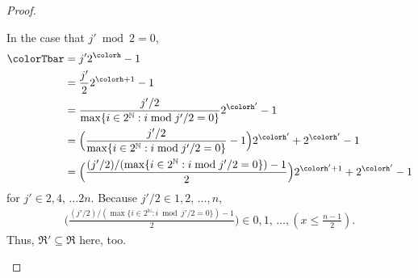 \begin{proof}
\begin{proofpart}
In the case that $j' \bmod 2 = 0$, 
\begin{align*}
\colorTbar
&= j'2^{\colorh} - 1\\
&= \frac{j'}{2}2^{\colorh + 1} - 1\\
&= \frac{j'/2}{\max\{ i \in 2^{\mathbb{N}} : i \bmod j'/2 = 0 \}}2^{\colorh'} - 1\\
&= \Big(\frac{j'/2}{\max\{ i \in 2^{\mathbb{N}} : i \bmod j'/2 = 0 \}} - 1\Big) 2^{\colorh'} + 2^{\colorh'} - 1\\
&= \Big(\frac{(j'/2)/(\max\{ i \in 2^{\mathbb{N}} : i \bmod j'/2 = 0 \}) - 1}{2}\Big) 2^{\colorh' + 1} + 2^{\colorh'} - 1\\
\end{align*}
for $j' \in 2, 4, \,\ldots 2n$.
Because $j'/2 \in 1, 2, \, \ldots, n$,
\begin{align*}
\Big(\frac{(j'/2)/(\max\{ i \in 2^{\mathbb{N}} : i \bmod j'/2 = 0 \}) - 1}{2}\Big)
\in 0,1, \, \ldots, (x \leq \frac{n - 1}{2}). 
\end{align*}
Thus,  $\mathfrak{R}' \subseteq \mathfrak{R}$ here, too.
\end{proofpart}
\end{proof}
